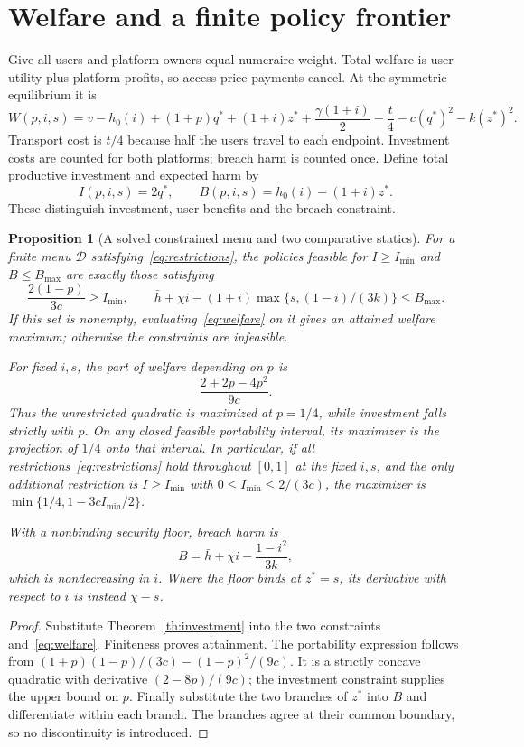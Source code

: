 \documentclass[11pt,a4paper]{article}
\newtheorem{proposition}[theorem]{Proposition}
\theoremstyle{definition}
\theoremstyle{remark}
\begin{document}
\section{Welfare and a finite policy frontier}
Give all users and platform owners equal numeraire weight. Total welfare is user utility plus platform profits, so access-price payments cancel. At the symmetric equilibrium it is
\begin{equation}\label{eq:welfare}
 W(p,i,s)=v-h_0(i)+(1+p)q^*+(1+i)z^*
       +\frac{\gamma(1+i)}2-\frac t4-c(q^*)^2-k(z^*)^2.
\end{equation}
Transport cost is $t/4$ because half the users travel to each endpoint. Investment costs are counted for both platforms; breach harm is counted once. Define total productive investment and expected harm by
\[
 I(p,i,s)=2q^*,\qquad B(p,i,s)=h_0(i)-(1+i)z^*.
\]
These distinguish investment, user benefits and the breach constraint.

\begin{proposition}[A solved constrained menu and two comparative statics]
For a finite menu $\mathcal D$ satisfying~\eqref{eq:restrictions}, the policies feasible for $I\geq I_{\min}$ and $B\leq B_{\max}$ are exactly those satisfying
\[
 \frac{2(1-p)}{3c}\geq I_{\min},\qquad
 \bar h+\chi i-(1+i)\max\{s,(1-i)/(3k)\}\leq B_{\max}.
\]
If this set is nonempty, evaluating~\eqref{eq:welfare} on it gives an attained welfare maximum; otherwise the constraints are infeasible.

For fixed $i,s$, the part of welfare depending on $p$ is
\[
 \frac{2+2p-4p^2}{9c}.
\]
Thus the unrestricted quadratic is maximized at $p=1/4$, while investment falls strictly with $p$. On any closed feasible portability interval, its maximizer is the projection of $1/4$ onto that interval. In particular, if all restrictions~\eqref{eq:restrictions} hold throughout $[0,1]$ at the fixed $i,s$, and the only additional restriction is $I\geq I_{\min}$ with $0\leq I_{\min}\leq2/(3c)$, the maximizer is
$\min\{1/4,1-3cI_{\min}/2\}$.

With a nonbinding security floor, breach harm is
\[
 B=\bar h+\chi i-\frac{1-i^2}{3k},
\]
which is nondecreasing in $i$. Where the floor binds at $z^*=s$, its derivative with respect to $i$ is instead $\chi-s$.
\end{proposition}
\begin{proof}
Substitute Theorem~\ref{th:investment} into the two constraints and~\eqref{eq:welfare}. Finiteness proves attainment. The portability expression follows from
$(1+p)(1-p)/(3c)-(1-p)^2/(9c)$. It is a strictly concave quadratic with derivative $(2-8p)/(9c)$; the investment constraint supplies the upper bound on $p$. Finally substitute the two branches of $z^*$ into $B$ and differentiate within each branch. The branches agree at their common boundary, so no discontinuity is introduced.
\end{proof}
\end{document}
